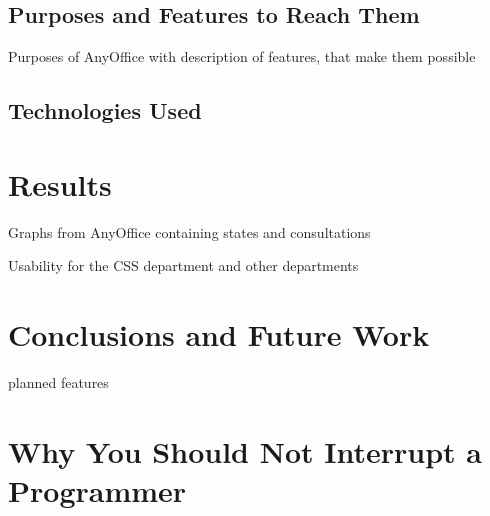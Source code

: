 \documentclass[11pt,singleside]{myfithesis2}
\begin{document}
	\section{Purposes and Features to Reach Them}
Purposes of AnyOffice with description of features, that make them possible

	\section{Technologies Used}

\chapter{Results}
Graphs from AnyOffice containing states and consultations

Usability for the CSS department and other departments

\chapter{Conclusions and Future Work}

planned features



\clearpage
{}
{}

\appendix

\chapter{Why You Should Not Interrupt a Programmer}\label{app:programmer}
%
\begin{figure}[htp] 
\cite{programmerInterrupted}
\end{figure}  
\end{document}
